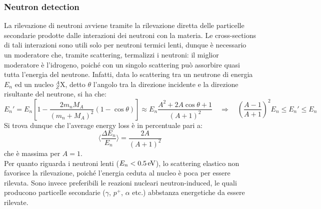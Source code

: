 \subsubsection{Neutron detection}

La rilevazione di neutroni avviene tramite la rilevazione diretta delle particelle secondarie prodotte dalle interazioni dei neutroni con la materia. Le cross-sections di tali interazioni sono utili solo per neutroni termici lenti, dunque è necessario un moderatore che, tramite scattering, termalizzi i neutroni: il miglior moderatore è l'idrogeno, poiché con un singolo scattering può assorbire quasi tutta l'energia del neutrone. Infatti, data lo scattering tra un neutrone di energia $ E_n $ ed un nucleo $ ^A_Z\text{X} $, detto $ \theta $ l'angolo tra la direzione incidente e la direzione risultante del neutrone, si ha che:
\begin{equation*}
	E_n' = E_n \left[ 1 - \frac{2 m_n M_A}{(m_n + M_A)^2} (1 - \cos \theta) \right] \approx E_n \frac{A^2 + 2A \cos \theta + 1}{(A + 1)^2} \quad\Rightarrow\quad \left( \frac{A - 1}{A + 1} \right)^2 E_n \le E_n' \le E_n
\end{equation*}
Si trova dunque che l'average energy loss è in percentuale pari a:
\begin{equation}
	\bigg\langle \frac{\Delta E_n}{E_n} \bigg\rangle = \frac{2A}{(A + 1)^2}
	\label{eq:3.13}
\end{equation}
che è massima per $ A = 1 $.\\
Per quanto riguarda i neutroni lenti ($ E_n < 0.5 \,\mathrm{eV} $), lo scattering elastico non favorisce la rilevazione, poiché l'energia ceduta al nucleo è poca per essere rilevata. Sono invece preferibili le reazioni nucleari neutron-induced, le quali producono particelle secondarie ($ \gamma $, $ p^+ $, $ \alpha $ etc.) abbstanza energetiche da essere rilevate.










